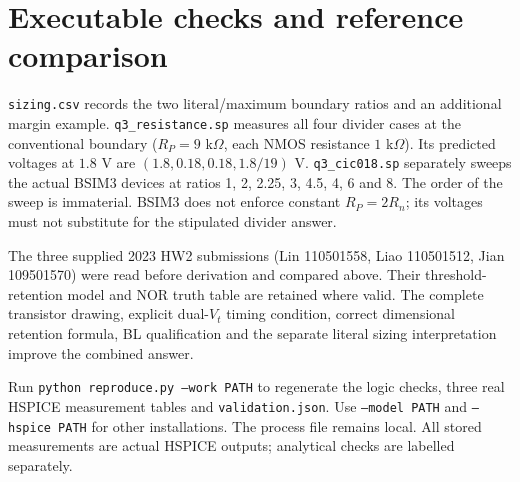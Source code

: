 \documentclass[11pt,a4paper]{article}
\begin{document}
\clearpage
\section*{Executable checks and reference comparison}
\texttt{sizing.csv} records the two literal/maximum boundary ratios and an
additional margin example. \texttt{q3\_resistance.sp} measures all four
divider cases at the conventional boundary ($R_P=9$ k$\Omega$, each NMOS
resistance $1$ k$\Omega$). Its predicted voltages at $1.8$ V are
$(1.8,0.18,0.18,1.8/19)$ V. \texttt{q3\_cic018.sp} separately sweeps
the actual BSIM3 devices at ratios 1, 2, 2.25, 3, 4.5, 4, 6 and 8.
The order of the sweep is immaterial. BSIM3 does not enforce constant
$R_P=2R_n$; its voltages must not substitute for the stipulated divider answer.

The three supplied 2023 HW2 submissions (Lin 110501558, Liao 110501512,
Jian 109501570) were read before derivation and compared above. Their
threshold-retention model and NOR truth table are retained where valid.
The complete transistor drawing, explicit dual-$V_t$ timing condition,
correct dimensional retention formula, BL qualification and the separate
literal sizing interpretation improve the combined answer.

Run \texttt{python reproduce.py --work PATH} to regenerate the logic checks,
three real HSPICE measurement tables and \texttt{validation.json}.
Use \texttt{--model PATH} and \texttt{--hspice PATH} for other installations.
The process file remains local. All stored measurements are actual HSPICE
outputs; analytical checks are labelled separately.
\end{document}
